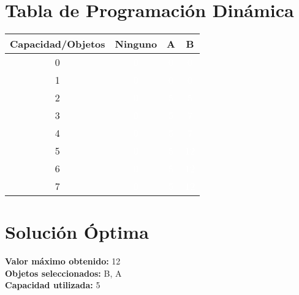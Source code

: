 \documentclass{article}
\begin{document}
\section*{Tabla de Programación Dinámica}
\begin{center}
\scriptsize
\begin{tabular}{|c|c|c|c|}
\hline
Capacidad/Objetos & Ninguno & A & B \\ \hline
0 & \cellcolor{rojo}\textcolor{white}{0} & \cellcolor{rojo}\textcolor{white}{0} & \cellcolor{rojo}\textcolor{white}{0} \\ \hline
1 & \cellcolor{rojo}\textcolor{white}{0} & \cellcolor{rojo}\textcolor{white}{0} & \cellcolor{rojo}\textcolor{white}{0} \\ \hline
2 & \cellcolor{rojo}\textcolor{white}{0} & \cellcolor{verde}\textcolor{white}{5} & \cellcolor{rojo}\textcolor{white}{5} \\ \hline
3 & \cellcolor{rojo}\textcolor{white}{0} & \cellcolor{verde}\textcolor{white}{5} & \cellcolor{verde}\textcolor{white}{7} \\ \hline
4 & \cellcolor{rojo}\textcolor{white}{0} & \cellcolor{verde}\textcolor{white}{5} & \cellcolor{verde}\textcolor{white}{7} \\ \hline
5 & \cellcolor{rojo}\textcolor{white}{0} & \cellcolor{verde}\textcolor{white}{5} & \cellcolor{verde}\textcolor{white}{12} \\ \hline
6 & \cellcolor{rojo}\textcolor{white}{0} & \cellcolor{verde}\textcolor{white}{5} & \cellcolor{verde}\textcolor{white}{12} \\ \hline
7 & \cellcolor{rojo}\textcolor{white}{0} & \cellcolor{verde}\textcolor{white}{5} & \cellcolor{verde}\textcolor{white}{12} \\ \hline
\end{tabular}
\end{center}
\normalsize

\section*{Solución Óptima}
\textbf{Valor máximo obtenido:} 12\\
\textbf{Objetos seleccionados:} B, A\\
\textbf{Capacidad utilizada:} 5\\
\end{document}
